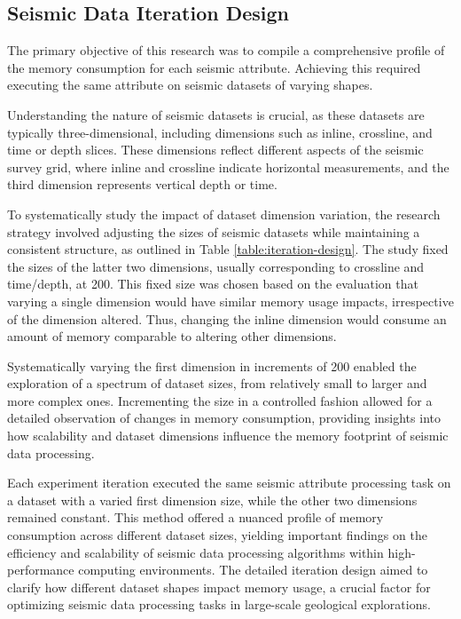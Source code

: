 \subsection{Seismic Data Iteration Design}

The primary objective of this research was to compile a comprehensive profile of the memory consumption for each seismic attribute.
Achieving this required executing the same attribute on seismic datasets of varying shapes.

Understanding the nature of seismic datasets is crucial, as these datasets are typically three-dimensional, including dimensions such as inline, crossline, and time or depth slices.
These dimensions reflect different aspects of the seismic survey grid, where inline and crossline indicate horizontal measurements, and the third dimension represents vertical depth or time.

To systematically study the impact of dataset dimension variation, the research strategy involved adjusting the sizes of seismic datasets while maintaining a consistent structure, as outlined in Table \ref{table:iteration-design}.
The study fixed the sizes of the latter two dimensions, usually corresponding to crossline and time/depth, at 200.
This fixed size was chosen based on the evaluation that varying a single dimension would have similar memory usage impacts, irrespective of the dimension altered.
Thus, changing the inline dimension would consume an amount of memory comparable to altering other dimensions.

Systematically varying the first dimension in increments of 200 enabled the exploration of a spectrum of dataset sizes, from relatively small to larger and more complex ones.
Incrementing the size in a controlled fashion allowed for a detailed observation of changes in memory consumption, providing insights into how scalability and dataset dimensions influence the memory footprint of seismic data processing.

Each experiment iteration executed the same seismic attribute processing task on a dataset with a varied first dimension size, while the other two dimensions remained constant.
This method offered a nuanced profile of memory consumption across different dataset sizes, yielding important findings on the efficiency and scalability of seismic data processing algorithms within high-performance computing environments.
The detailed iteration design aimed to clarify how different dataset shapes impact memory usage, a crucial factor for optimizing seismic data processing tasks in large-scale geological explorations.

